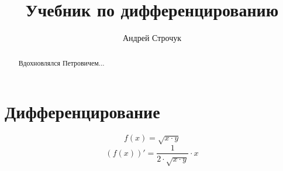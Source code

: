 \documentclass{article}
\title{Учебник по дифференцированию}
\author{Андрей Строчук}
\begin{document}
\maketitle
\begin{abstract}
Вдохновлялся Петровичем...
\end{abstract}
\section{Дифференцирование}
\[f(x) = \sqrt{{x} \cdot {y}}\]
\[(f(x))' = \frac{{1}}{{2} \cdot \sqrt{{x} \cdot {y}}} \cdot {x}\]
\end{document}
